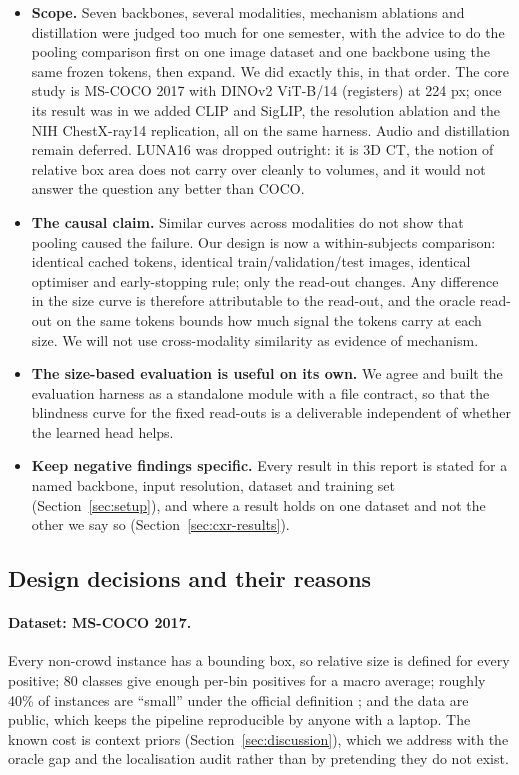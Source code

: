 \documentclass[10pt,letterpaper,twocolumn]{article}
\begin{document}
\begin{itemize}
\item \textbf{Scope.} Seven backbones, several modalities, mechanism ablations and distillation
  were judged too much for one semester, with the advice to do the pooling comparison first on
  one image dataset and one backbone using the same frozen tokens, then expand. We did exactly
  this, in that order. The core study is MS-COCO 2017 with DINOv2 ViT-B/14 (registers) at
  224 px; once its result was in we added CLIP and SigLIP, the resolution ablation and the NIH
  ChestX-ray14 replication, all on the same harness. Audio and distillation remain deferred.
  LUNA16 was dropped outright: it is 3D CT, the notion of relative box area does not carry
  over cleanly to volumes, and it would not answer the question any better than COCO.
\item \textbf{The causal claim.} Similar curves across modalities do not show that pooling
  caused the failure. Our design is now a within-subjects comparison: identical cached tokens,
  identical train/validation/test images, identical optimiser and early-stopping rule; only the
  read-out changes. Any difference in the size curve is therefore attributable to the read-out,
  and the oracle read-out on the same tokens bounds how much signal the tokens carry at each
  size. We will not use cross-modality similarity as evidence of mechanism.
\item \textbf{The size-based evaluation is useful on its own.} We agree and built the
  evaluation harness as a standalone module with a file contract, so that the blindness curve
  for the fixed read-outs is a deliverable independent of whether the learned head helps.
\item \textbf{Keep negative findings specific.} Every result in this report is stated for a
  named backbone, input resolution, dataset and training set (Section~\ref{sec:setup}), and
  where a result holds on one dataset and not the other we say so
  (Section~\ref{sec:cxr-results}).
\end{itemize}

\subsection{Design decisions and their reasons}
\paragraph{Dataset: MS-COCO 2017.}
Every non-crowd instance has a bounding box, so relative size is defined for every positive;
80 classes give enough per-bin positives for a macro average; roughly 40\% of instances are
``small'' under the official definition \citep{lin2014coco}; and the data are public, which
keeps the pipeline reproducible by anyone with a laptop. The known cost is context priors
(Section~\ref{sec:discussion}), which we address with the oracle gap and the localisation
audit rather than by pretending they do not exist.
\end{document}
